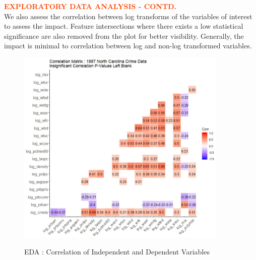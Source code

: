 \pagebreak

\textbf{\textcolor{OrangeRed}{EXPLORATORY DATA ANALYSIS - CONTD.}}\\

We also assess the correlation between log transforms of the variables of interest to assess the impact.  Feature intersections where there exists a low statistical significance are also removed from the plot for better visibility.  Generally, the impact is minimal to correlation between log and non-log transformed variables.\\

\begin{figure}[!ht]
	\centering
	\includegraphics[width=0.9\textwidth]{images/EDA_log_correlation.jpg}
	\label{fig:EDA Correlation Matrix2}
	\caption{EDA : Correlation of Independent and Dependent Variables}
\end{figure}